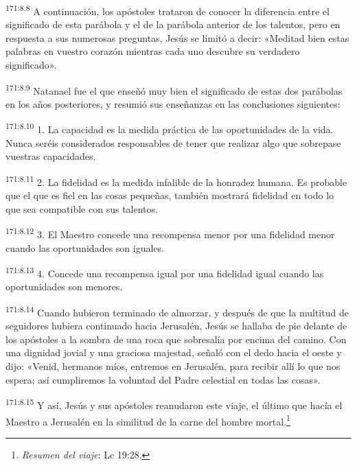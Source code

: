 \par 
\textsuperscript{171:8.8} A continuación, los apóstoles trataron de conocer la diferencia entre el significado de esta parábola y el de la parábola anterior de los talentos, pero en respuesta a sus numerosas preguntas, Jesús se limitó a decir: «Meditad bien estas palabras en vuestro corazón mientras cada uno descubre su verdadero significado».

\par 
\textsuperscript{171:8.9} Natanael fue el que enseñó muy bien el significado de estas dos parábolas en los años posteriores, y resumió sus enseñanzas en las conclusiones siguientes:

\par 
\textsuperscript{171:8.10} 1. La capacidad es la medida práctica de las oportunidades de la vida. Nunca seréis considerados responsables de tener que realizar algo que sobrepase vuestras capacidades.

\par 
\textsuperscript{171:8.11} 2. La fidelidad es la medida infalible de la honradez humana. Es probable que el que es fiel en las cosas pequeñas, también mostrará fidelidad en todo lo que sea compatible con sus talentos.

\par 
\textsuperscript{171:8.12} 3. El Maestro concede una recompensa menor por una fidelidad menor cuando las oportunidades son iguales.

\par 
\textsuperscript{171:8.13} 4. Concede una recompensa igual por una fidelidad igual cuando las oportunidades son menores.

\par 
\textsuperscript{171:8.14} Cuando hubieron terminado de almorzar, y después de que la multitud de seguidores hubiera continuado hacia Jerusalén, Jesús se hallaba de pie delante de los apóstoles a la sombra de una roca que sobresalía por encima del camino. Con una dignidad jovial y una graciosa majestad, señaló con el dedo hacia el oeste y dijo: «Venid, hermanos míos, entremos en Jerusalén, para recibir allí lo que nos espera; así cumpliremos la voluntad del Padre celestial en todas las cosas».

\par 
\textsuperscript{171:8.15} Y así, Jesús y sus apóstoles reanudaron este viaje, el último que hacía el Maestro a Jerusalén en la similitud de la carne del hombre mortal.\footnote{\textit{Resumen del viaje}: Lc 19:28.}